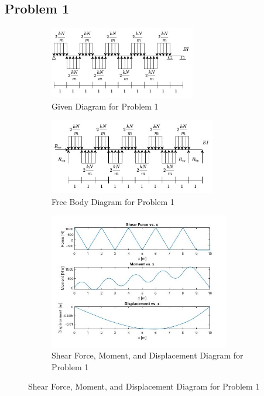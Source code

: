 \documentclass[a4paper]{article}
\begin{document}
\subsection{Problem 1}
\begin{figure}[H]
\centering
   \begin{subfigure}[b]{\textwidth}
   \centering
   \includegraphics[width=0.7\textwidth]{problems/prob_1.jpg}
   \caption{Given Diagram for Problem 1}
   \label{prob1:prob} 
\end{subfigure}
\begin{subfigure}[b]{\textwidth}
   \centering   
   \includegraphics[width=0.8\textwidth]{FBD/FBD_1.jpg}
   \caption{Free Body Diagram for Problem 1}
   \label{prob1:FBD}
\end{subfigure}
\begin{subfigure}[b]{\textwidth}
   \centering   
   \includegraphics[width=0.87\textwidth]{results/solution_1.jpg}
   \caption{Shear Force, Moment, and Displacement Diagram for Problem 1}
   \label{prob1:results}
\end{subfigure}
\label{prob1}
\end{figure}
\end{document}

